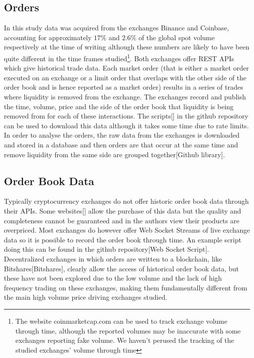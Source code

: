 \documentclass[a4paper,10pt]{article}
\begin{document}
\subsection{Orders}
In this study data was acquired from the exchanges Binance and Coinbase, accounting for approximately $17\%$ and $2.6\%$ of the global spot volume respectively at the time of writing\cite{FTX} although these numbers are likely to have been quite different in the time frames studied\footnote{The website coinmarketcap.com can be used to track exchange volume through time, although the reported volumes may be inaccurate with some exchanges reporting fake volume. We haven't perused the tracking of the studied exchanges' volume through time}. Both exchanges offer REST APIs\cite{binance}\cite{coinbase} which give historical trade data. Each market order (that is either a market order executed on an exchange or a limit order that overlaps with the other side of the order book and is hence reported as a market order) results in a series of trades where liquidity is removed from the exchange. The exchanges record and publish the time, volume, price and the side of the order book that liquidity is being removed from for each of these interactions. The scripts[] in the github repository can be used to download this data although it takes some time due to rate limits. In order to analyse the orders, the raw data from the exchanges is downloaded and stored in a database and then orders are that occur at the same time and remove liquidity from the same side are grouped together[Github library].
\subsection{Order Book Data}
Typically cryptocurrency exchanges do not offer historic order book data through their APIs. Some websites[] allow the purchase of this data but the quality and completeness cannot be guaranteed and in the authors view their products are overpriced. Most exchanges do however offer Web Socket Streams of live exchange data so it is possible to record the order book through time. An example script doing this can be found in the github repository[Web Socket Script]. Decentralized exchanges in which orders are written to a blockchain, like Bitshares[Bitshares], clearly allow the access of historical order book data, but these have not been explored due to the low volume and the lack of high frequency trading on these exchanges, making them fundamentally different from the main high volume price driving exchanges studied. 
\end{document}
